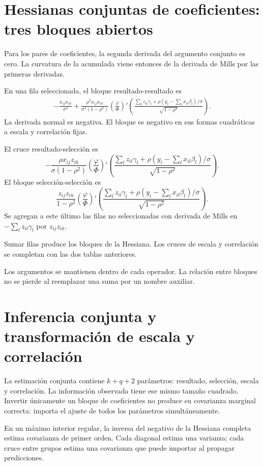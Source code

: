 \documentclass[11pt,a4paper]{article}
\begin{document}
\clearpage
\section{Hessianas conjuntas de coeficientes: tres bloques abiertos}\label{unidad149}
Para los pares de coeficientes,
la segunda derivada del
argumento conjunto es cero.
La curvatura de la
acumulada viene entonces
de la derivada de Mills
por las primeras derivadas.

En una fila seleccionada,
el bloque resultado-resultado es
\[
\begin{aligned}
-\frac{x_{ij}x_{ih}}{\sigma^2}
+\frac{\rho^2x_{ij}x_{ih}}{\sigma^2(1-\rho^2)}
\left(\frac{\varphi}{\Phi}\right)'
\left(
\frac{\sum_lz_{il}\gamma_l+
\rho(y_i-\sum_lx_{il}\beta_l)/\sigma}
{\sqrt{1-\rho^2}}\right).
\end{aligned}
\]
La derivada normal es negativa.
El bloque es negativo
en sus formas cuadráticas
a escala y correlación fijas.

El cruce resultado-selección es
\[
-\frac{\rho x_{ij}z_{ih}}{\sigma(1-\rho^2)}
\left(\frac{\varphi}{\Phi}\right)'
\left(
\frac{\sum_lz_{il}\gamma_l+
\rho(y_i-\sum_lx_{il}\beta_l)/\sigma}
{\sqrt{1-\rho^2}}\right).
\]
El bloque selección-selección es
\[
\frac{z_{ij}z_{ih}}{1-\rho^2}
\left(\frac{\varphi}{\Phi}\right)'
\left(
\frac{\sum_lz_{il}\gamma_l+
\rho(y_i-\sum_lx_{il}\beta_l)/\sigma}
{\sqrt{1-\rho^2}}\right).
\]
Se agregan a este último
las filas no seleccionadas
con derivada de Mills
en \(-\sum_lz_{il}\gamma_l\)
por \(z_{ij}z_{ih}\).

Sumar filas produce los
bloques de la Hessiana.
Los cruces de escala
y correlación se completan
con las dos tablas anteriores.

Los argumentos se mantienen
dentro de cada operador.
La relación entre bloques
no se pierde al
reemplazar una suma
por un nombre auxiliar.

\clearpage
\section{Inferencia conjunta y transformación de escala y correlación}\label{unidad150}
La estimación conjunta contiene
\(k+q+2\) parámetros:
resultado, selección, escala y correlación.
La información observada tiene
ese mismo tamaño cuadrado.
Invertir únicamente un bloque
de coeficientes no produce
su covarianza marginal correcta:
importa el ajuste de
todos los parámetros simultáneamente.

En un máximo interior regular,
la inversa del negativo
de la Hessiana completa
estima covarianza de primer orden.
Cada diagonal estima una varianza;
cada cruce entre grupos
estima una covarianza
que puede importar al
propagar predicciones.
\end{document}
